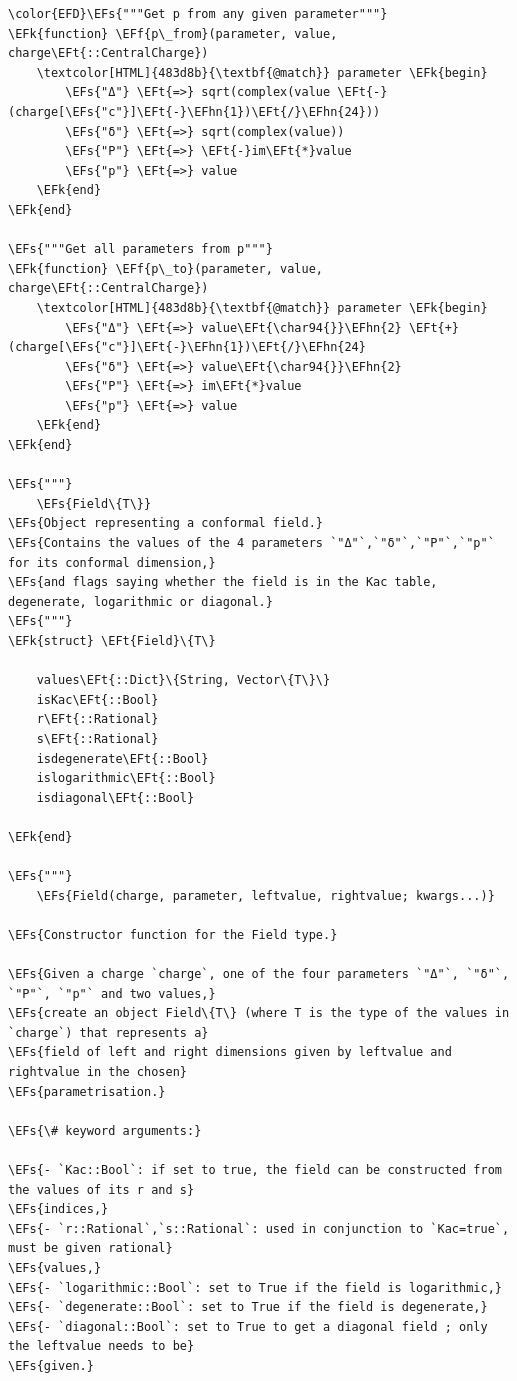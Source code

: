 \documentclass[a4paper]{article}
\numberwithin{equation}{section}
\newcommand{\EFs}[1]{\textcolor{EFs}{#1}} %
\newcommand{\EFk}[1]{\textcolor{EFk}{#1}} %
\newcommand{\EFf}[1]{\textcolor{EFf}{#1}} %
\newcommand{\EFt}[1]{\textcolor{EFt}{#1}} %
\newcommand{\EFhn}[1]{\textcolor{EFhn}{#1}} %
\begin{document}
\begin{Code}
\begin{Verbatim}
\color{EFD}\EFs{"""Get p from any given parameter"""}
\EFk{function} \EFf{p\_from}(parameter, value, charge\EFt{::CentralCharge})
    \textcolor[HTML]{483d8b}{\textbf{@match}} parameter \EFk{begin}
        \EFs{"Δ"} \EFt{=>} sqrt(complex(value \EFt{-} (charge[\EFs{"c"}]\EFt{-}\EFhn{1})\EFt{/}\EFhn{24}))
        \EFs{"δ"} \EFt{=>} sqrt(complex(value))
        \EFs{"P"} \EFt{=>} \EFt{-}im\EFt{*}value
        \EFs{"p"} \EFt{=>} value
    \EFk{end}
\EFk{end}

\EFs{"""Get all parameters from p"""}
\EFk{function} \EFf{p\_to}(parameter, value, charge\EFt{::CentralCharge})
    \textcolor[HTML]{483d8b}{\textbf{@match}} parameter \EFk{begin}
        \EFs{"Δ"} \EFt{=>} value\EFt{\char94{}}\EFhn{2} \EFt{+} (charge[\EFs{"c"}]\EFt{-}\EFhn{1})\EFt{/}\EFhn{24}
        \EFs{"δ"} \EFt{=>} value\EFt{\char94{}}\EFhn{2}
        \EFs{"P"} \EFt{=>} im\EFt{*}value
        \EFs{"p"} \EFt{=>} value
    \EFk{end}
\EFk{end}

\EFs{"""}
    \EFs{Field\{T\}}
\EFs{Object representing a conformal field.}
\EFs{Contains the values of the 4 parameters `"Δ"`,`"δ"`,`"P"`,`"p"` for its conformal dimension,}
\EFs{and flags saying whether the field is in the Kac table, degenerate, logarithmic or diagonal.}
\EFs{"""}
\EFk{struct} \EFt{Field}\{T\}

    values\EFt{::Dict}\{String, Vector\{T\}\}
    isKac\EFt{::Bool}
    r\EFt{::Rational}
    s\EFt{::Rational}
    isdegenerate\EFt{::Bool}
    islogarithmic\EFt{::Bool}
    isdiagonal\EFt{::Bool}

\EFk{end}

\EFs{"""}
    \EFs{Field(charge, parameter, leftvalue, rightvalue; kwargs...)}

\EFs{Constructor function for the Field type.}

\EFs{Given a charge `charge`, one of the four parameters `"Δ"`, `"δ"`, `"P"`, `"p"` and two values,}
\EFs{create an object Field\{T\} (where T is the type of the values in `charge`) that represents a}
\EFs{field of left and right dimensions given by leftvalue and rightvalue in the chosen}
\EFs{parametrisation.}

\EFs{\# keyword arguments:}

\EFs{- `Kac::Bool`: if set to true, the field can be constructed from the values of its r and s}
\EFs{indices,}
\EFs{- `r::Rational`,`s::Rational`: used in conjunction to `Kac=true`, must be given rational}
\EFs{values,}
\EFs{- `logarithmic::Bool`: set to True if the field is logarithmic,}
\EFs{- `degenerate::Bool`: set to True if the field is degenerate,}
\EFs{- `diagonal::Bool`: set to True to get a diagonal field ; only the leftvalue needs to be}
\EFs{given.}


\end{Verbatim}
\end{Code}
\end{document}
